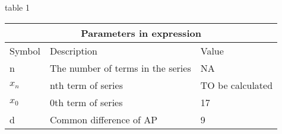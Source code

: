 \setlength{\arrayrulewidth}{0.3mm}
\setlength{\tabcolsep}{15pt}
\renewcommand{\arraystretch}{1.5}

table 1\\

\begin{tabular}{ |p{1cm}|p{3cm}|p{1cm}| }
\hline
\multicolumn{3}{|c|}{Parameters in expression}\\
\hline
Symbol & Description & Value\\
\hline
n & The number of terms in the series & NA\\
\hline
$x_n$ & nth term of series & TO be calculated\\
\hline
$x_0$ & 0th term of series & 17 \\
\hline
d & Common difference of AP & 9\\
\hline
\end{tabular}
